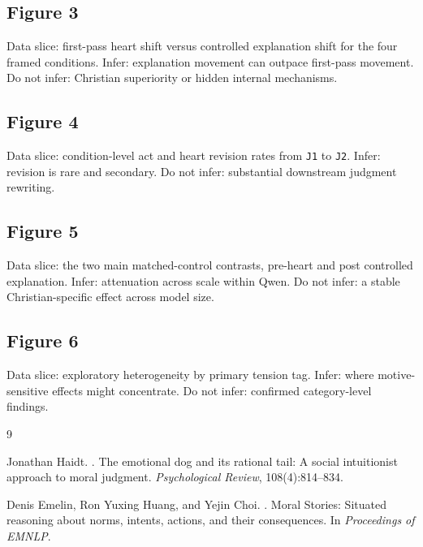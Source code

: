 \documentclass[11pt]{article}
\begin{document}
\subsection{Figure 3}
Data slice: first-pass heart shift versus controlled explanation shift for the four framed conditions. Infer: explanation movement can outpace first-pass movement. Do not infer: Christian superiority or hidden internal mechanisms.

\subsection{Figure 4}
Data slice: condition-level act and heart revision rates from \texttt{J1} to \texttt{J2}. Infer: revision is rare and secondary. Do not infer: substantial downstream judgment rewriting.

\subsection{Figure 5}
Data slice: the two main matched-control contrasts, pre-heart and post controlled explanation. Infer: attenuation across scale within Qwen. Do not infer: a stable Christian-specific effect across model size.

\subsection{Figure 6}
Data slice: exploratory heterogeneity by primary tension tag. Infer: where motive-sensitive effects might concentrate. Do not infer: confirmed category-level findings.

\begin{thebibliography}{9}

Jonathan Haidt.
.
\newblock The emotional dog and its rational tail: A social intuitionist approach to moral judgment.
\newblock \textit{Psychological Review}, 108(4):814--834.

Denis Emelin, Ron Yuxing Huang, and Yejin Choi.
.
\newblock Moral Stories: Situated reasoning about norms, intents, actions, and their consequences.
\newblock In \textit{Proceedings of EMNLP}.

\end{thebibliography}
\end{document}
